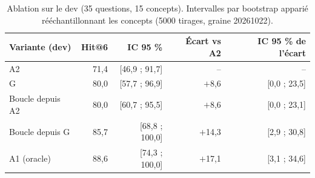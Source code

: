 \begin{table}[H]
\centering
\small
\begin{tabular}{lrrrr}
\toprule
Variante (dev) & Hit@6 & IC 95 \% & Écart vs A2 & IC 95 \% de l'écart \\
\midrule
A2 & 71{,}4 & [46{,}9 ; 91{,}7] & -- & -- \\
G & 80{,}0 & [57{,}7 ; 96{,}9] & $+$8{,}6 & [0{,}0 ; 23{,}5] \\
Boucle depuis A2 & 80{,}0 & [60{,}7 ; 95{,}5] & $+$8{,}6 & [0{,}0 ; 23{,}1] \\
Boucle depuis G & 85{,}7 & [68{,}8 ; 100{,}0] & $+$14{,}3 & [2{,}9 ; 30{,}8] \\
A1 (oracle) & 88{,}6 & [74{,}3 ; 100{,}0] & $+$17{,}1 & [3{,}1 ; 34{,}6] \\
\bottomrule
\end{tabular}
\caption{Ablation sur le dev (35 questions, 15 concepts). Intervalles par bootstrap apparié rééchantillonnant les concepts (5000 tirages, graine 20261022).}
\label{tab:ablation}
\end{table}
